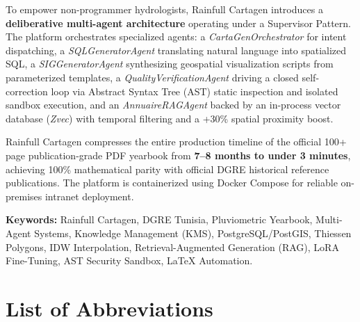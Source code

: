 \documentclass[12pt,a4paper]{report}
\begin{document}
To empower non-programmer hydrologists, Rainfull Cartagen introduces a \textbf{deliberative multi-agent architecture} operating under a Supervisor Pattern. The platform orchestrates specialized agents: a \textit{CartaGenOrchestrator} for intent dispatching, a \textit{SQLGeneratorAgent} translating natural language into spatialized SQL, a \textit{SIGGeneratorAgent} synthesizing geospatial visualization scripts from parameterized templates, a \textit{QualityVerificationAgent} driving a closed self-correction loop via Abstract Syntax Tree (AST) static inspection and isolated sandbox execution, and an \textit{AnnuaireRAGAgent} backed by an in-process vector database (\textit{Zvec}) with temporal filtering and a +30\% spatial proximity boost. 

Rainfull Cartagen compresses the entire production timeline of the official 100+ page publication-grade PDF yearbook from \textbf{7--8 months to under 3 minutes}, achieving 100\% mathematical parity with official DGRE historical reference publications. The platform is containerized using Docker Compose for reliable on-premises intranet deployment.

\vspace{0.6cm}
\noindent\textbf{Keywords:} Rainfull Cartagen, DGRE Tunisia, Pluviometric Yearbook, Multi-Agent Systems, Knowledge Management (KMS), PostgreSQL/PostGIS, Thiessen Polygons, IDW Interpolation, Retrieval-Augmented Generation (RAG), LoRA Fine-Tuning, AST Security Sandbox, LaTeX Automation.

\newpage

\tableofcontents
\newpage
\listoffigures
\newpage
\listoftables
\newpage

\chapter*{List of Abbreviations}
\end{document}
